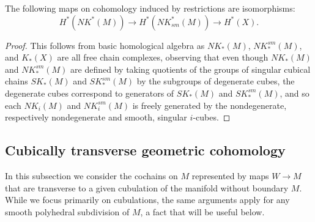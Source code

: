 \begin{corollary}
	The following maps on cohomology induced by restrictions are isomorphisms: $$H^*(NK^*(M)) \to H^*(NK_{sm}^*(M)) \to H^*(X).$$
\end{corollary}

\begin{proof}
	This follows from basic homological algebra \cite[Theorem 45.5]{Mun84} as $NK_*(M)$, $NK^{sm}_*(M)$, and $K_*(X)$ are all free chain complexes, observing that even though $NK_*(M)$ and $NK^{sm}_*(M)$ are defined by taking quotients of the groups of singular cubical chains $SK_*(M)$ and $SK^{sm}_*(M)$ by the subgroups of degenerate cubes, the degenerate cubes correspond to generators of $SK_*(M)$ and $SK^{sm}_*(M)$, and so each $NK_i(M)$ and $NK^{sm}_i(M)$ is freely generated by the nondegenerate, respectively nondegenerate and smooth, singular $i$-cubes.
\end{proof}

\subsection{Cubically transverse geometric cohomology}\label{S: transverse cochains}

In this subsection we consider the cochains on $M$ represented by maps $W \to M$ that are transverse to a given cubulation of the manifold without boundary $M$.
While we focus primarily on cubulations, the same arguments apply for any smooth polyhedral subdivision of $M$, a fact that will be useful below.


